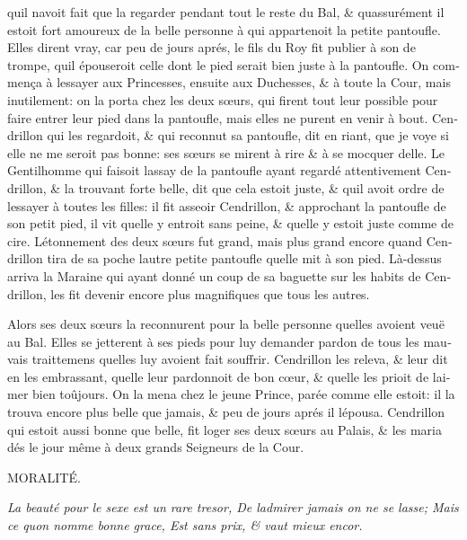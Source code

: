 \documentclass[14pt,a4paper]{memoir}
\begin{document}
\begin{otherlanguage}{french}
qu\textquotesingle il n\textquotesingle avoit fait que la regarder
pendant tout le reste du Bal, \& qu\textquotesingle assurément il estoit
fort amoureux de la belle personne à qui appartenoit la petite
pantoufle. Elles dirent vray, car peu de jours aprés, le fils du Roy fit
publier à son de trompe, qu\textquotesingle il épouseroit celle dont le
pied serait bien juste à la pantoufle. On commença à
l\textquotesingle essayer aux Princesses, ensuite aux Duchesses, \& à
toute la Cour, mais inutilement: on la porta chez les deux sœurs, qui
firent tout leur possible pour faire entrer leur pied dans la pantoufle,
mais elles ne purent en venir à bout. Cendrillon qui les regardoit, \&
qui reconnut sa pantoufle, dit en riant, que je voye si elle ne me
seroit pas bonne: ses sœurs se mirent à rire \& à se mocquer
d\textquotesingle elle. Le Gentilhomme qui faisoit
l\textquotesingle assay de la pantoufle ayant regardé attentivement
Cendrillon, \& la trouvant forte belle, dit que cela estoit juste, \&
qu\textquotesingle il avoit ordre de l\textquotesingle essayer à toutes
les filles: il fit asseoir Cendrillon, \& approchant la pantoufle de son
petit pied, il vit qu\textquotesingle elle y entroit sans peine, \&
qu\textquotesingle elle y estoit juste comme de cire.
L\textquotesingle étonnement des deux sœurs fut grand, mais plus grand
encore quand Cendrillon tira de sa poche l\textquotesingle autre petite
pantoufle qu\textquotesingle elle mit à son pied. Là-dessus arriva la
Maraine qui ayant donné un coup de sa baguette sur les habits de
Cendrillon, les fit devenir encore plus magnifiques que tous les autres.

Alors ses deux sœurs la reconnurent pour la belle personne
qu\textquotesingle elles avoient veuë au Bal. Elles se jetterent à ses
pieds pour luy demander pardon de tous les mauvais traittemens
qu\textquotesingle elles luy avoient fait souffrir. Cendrillon les
releva, \& leur dit en les embrassant, qu\textquotesingle elle leur
pardonnoit de bon cœur, \& qu\textquotesingle elle les prioit de
l\textquotesingle aimer bien toûjours. On la mena chez le jeune Prince,
parée comme elle estoit: il la trouva encore plus belle que jamais, \&
peu de jours aprés il l\textquotesingle épousa. Cendrillon qui estoit
aussi bonne que belle, fit loger ses deux sœurs au Palais, \& les maria
dés le jour même à deux grands Seigneurs de la Cour.

MORALITÉ.

\emph{{La beauté pour le sexe est un rare tresor,} {De
l\textquotesingle admirer jamais on ne se lasse;} {Mais ce
qu\textquotesingle on nomme bonne grace,} {Est sans prix, \& vaut mieux
encor.}}


\end{otherlanguage}
\end{document}
